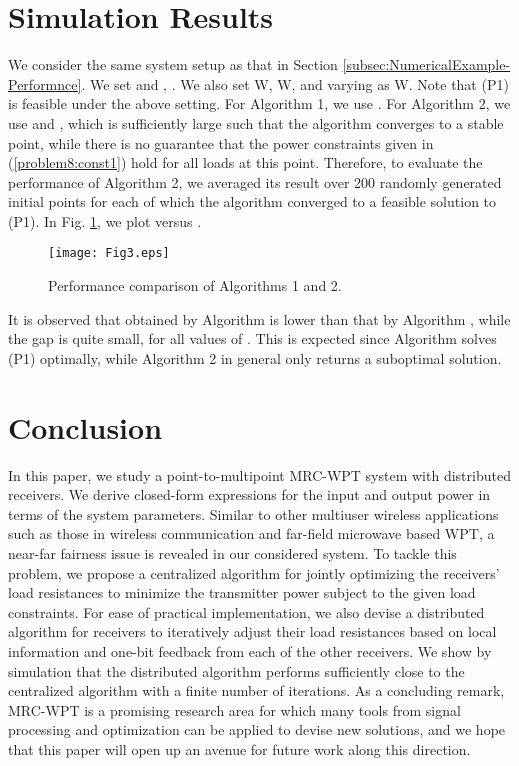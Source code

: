 \documentclass[onecolumn, a4size, 11pt]{IEEEtran}
\begin{document}
\section{Simulation Results} \label{sec:Simulation}
We consider the  same system setup as that in Section  \ref{subsec:NumericalExample-Performnce}. We set  and , . 
We also set W, W, and   varying  as W.  Note that (P1) is feasible under the above setting. 
For Algorithm 1, we use . For Algorithm 2, we use  and , which is sufficiently large such that the algorithm converges to a stable point, while  there is no guarantee that the power constraints given in  (\ref{problem8:const1}) hold for all loads at this point. 
Therefore, to evaluate the performance of Algorithm 2, we averaged its result  over 200  randomly generated initial points for each of which the algorithm converged to a feasible solution to (P1).
In Fig. \ref{fig:Simul-alg}, we plot  versus .
 \begin{figure}
 \centering
 \texttt{[image: Fig3.eps]} 
 \caption{Performance comparison of Algorithms 1 and 2.}  
 \label{fig:Simul-alg}
 \end{figure}
It is observed that     obtained by  Algorithm  is lower  than that by  Algorithm , while the gap is quite small,  for all values of . 
This is  expected since Algorithm  solves (P1)  optimally,  while Algorithm 2 in general only returns  a suboptimal solution. 
\section{Conclusion}
In this paper, we study a point-to-multipoint   MRC-WPT system with distributed  receivers. 
We derive  closed-form expressions for the input and output  power in terms of the system parameters. 
Similar to other multiuser wireless applications such as those in wireless communication and far-field microwave based WPT, a near-far fairness issue is  revealed in our considered system.    
To tackle this problem, we propose a centralized algorithm for jointly optimizing the receivers' load resistances  to minimize the transmitter power  subject to the given load  constraints.  
For ease of practical implementation,   we also devise  a distributed algorithm  for  receivers to iteratively adjust their load resistances based on local information and one-bit feedback  from each of the other receivers.   We show  by simulation   that the  distributed algorithm  performs  sufficiently close to  the centralized algorithm with a finite number of iterations. 
As a concluding remark, MRC-WPT is a  promising research area for which many tools from signal processing and optimization can be  applied to devise new solutions, and we hope that this paper will open up an avenue for future work along this direction.  
\end{document}
